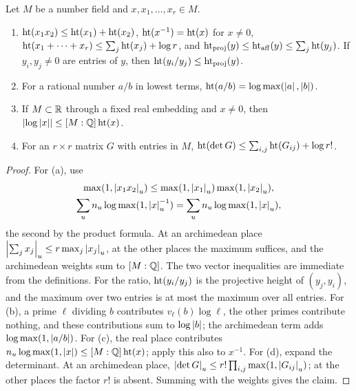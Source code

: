 \begin{lemma}
\label{lem:qc-heights}
Let $M$ be a number field and $x,x_1,\ldots,x_r\in M$.
\begin{enumerate}[label=(\alph*),leftmargin=*]
\item $\operatorname{ht}(x_1x_2)\le\operatorname{ht}(x_1)+\operatorname{ht}(x_2)$,
$\operatorname{ht}(x^{-1})=\operatorname{ht}(x)$ for $x\ne0$,
$\operatorname{ht}(x_1+\cdots+x_r)\le\sum_j\operatorname{ht}(x_j)+\log r$, and
$\operatorname{ht}_{\rm proj}(y)\le\operatorname{ht}_{\rm aff}(y)\le\sum_j\operatorname{ht}(y_j)$. If
$y_i,y_j\ne0$ are entries of $y$, then $\operatorname{ht}(y_i/y_j)\le\operatorname{ht}_{\rm proj}(y)$.
\item For a rational number $a/b$ in lowest terms,
$\operatorname{ht}(a/b)=\log\max(\left\lvert a\right\rvert,\left\lvert b\right\rvert)$.
\item If $M\subset\mathbb R$ through a fixed real embedding and $x\ne0$, then
$\left\lvert\log\left\lvert x\right\rvert\right\rvert\le[M:\mathbb Q]\operatorname{ht}(x)$.
\item For an $r\times r$ matrix $G$ with entries in $M$,
$\operatorname{ht}(\det G)\le\sum_{i,j}\operatorname{ht}(G_{ij})+\log r!$.
\end{enumerate}
\end{lemma}

\begin{proof}
For (a), use
\[
\begin{gathered}
\max(1,\left\lvert x_1x_2\right\rvert_u)\le\max(1,\left\lvert x_1\right\rvert_u)\max(1,\left\lvert x_2\right\rvert_u),\\
\sum_un_u\log\max(1,\left\lvert x\right\rvert_u^{-1})=\sum_un_u\log\max(1,\left\lvert x\right\rvert_u),
\end{gathered}
\]
the second by the product formula. At an archimedean place $\left\lvert\sum_jx_j\right\rvert_u\le r\max_j\left\lvert x_j\right\rvert_u$, at the other
places the maximum suffices, and the archimedean weights sum to $[M:\mathbb Q]$. The
two vector inequalities are immediate from the definitions. For the ratio,
$\operatorname{ht}(y_i/y_j)$ is the projective height of $(y_j,y_i)$, and the
maximum over two entries is at most the maximum over all entries. For (b),
a prime $\ell$ dividing $b$ contributes $v_\ell(b)\log\ell$, the other primes
contribute nothing, and these contributions sum to $\log\left\lvert b\right\rvert$; the
archimedean term adds $\log\max(1,\left\lvert a/b\right\rvert)$. For (c), the
real place contributes $n_u\log\max(1,\left\lvert x\right\rvert)\le[M:\mathbb Q]\operatorname{ht}(x)$; apply this
also to $x^{-1}$. For (d), expand the determinant. At an archimedean place,
$\left\lvert\det G\right\rvert_u\le r!\prod_{i,j}\max(1,\left\lvert G_{ij}\right\rvert_u)$; at the other places
the factor $r!$ is absent. Summing with the weights gives the claim.
\end{proof}

